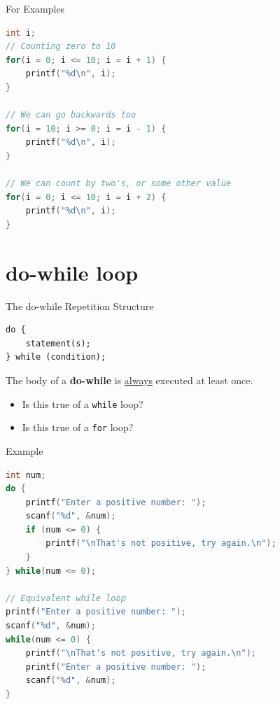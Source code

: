 \documentclass[graphics]{beamer}
\begin{document}
\begin{frame}[fragile]{For Examples}
    \begin{lstlisting}[language=C,basicstyle=\footnotesize,keywordstyle=\color{blue},commentstyle=\color{green},showstringspaces=false,stringstyle=\color{red}]
int i;
// Counting zero to 10
for(i = 0; i <= 10; i = i + 1) {
    printf("%d\n", i);
}

// We can go backwards too
for(i = 10; i >= 0; i = i - 1) {
    printf("%d\n", i);
}

// We can count by two's, or some other value
for(i = 0; i <= 10; i = i + 2) {
    printf("%d\n", i);
}
\end{lstlisting}
\end{frame}

\section*{do-while loop}
\begin{frame}[fragile]{The do-while Repetition Structure}
    \begin{verbatim}
do {
    statement(s);
} while (condition);
    \end{verbatim}
    The body of a \textbf{do-while} is \underline{always} executed at least once.
    \begin{itemize}
        \item Is this true of a \texttt{while} loop?
        \item Is this true of a \texttt{for} loop?
    \end{itemize}
\end{frame}

\begin{frame}[fragile]{Example}
    \begin{lstlisting}[language=C,basicstyle=\footnotesize,keywordstyle=\color{blue},commentstyle=\color{green},showstringspaces=false,stringstyle=\color{red}]
int num;
do {
    printf("Enter a positive number: ");
    scanf("%d", &num);
    if (num <= 0) {
        printf("\nThat's not positive, try again.\n");
    }
} while(num <= 0);

// Equivalent while loop
printf("Enter a positive number: ");
scanf("%d", &num);
while(num <= 0) {
    printf("\nThat's not positive, try again.\n");
    printf("Enter a positive number: ");
    scanf("%d", &num);
}
    \end{lstlisting}
\end{frame}
\end{document}
